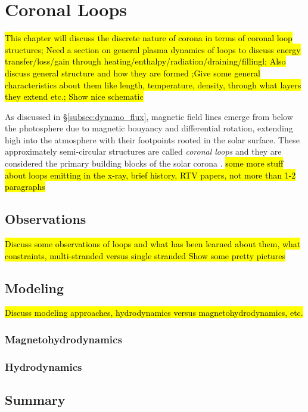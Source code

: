 \chapter{Coronal Loops}
\label{ch:coronal_loops}
\hl{This chapter will discuss the discrete nature of corona in terms of coronal loop structures; Need a section on general plasma dynamics of loops to discuss energy transfer/loss/gain through heating/enthalpy/radiation/draining/fillingl; Also discuss general structure and how they are formed ;Give some general characteristics about them like length, temperature, density, through what layers they extend etc.; Show nice schematic}
\par As discussed in \S\ref{subsec:dynamo_flux}, magnetic field lines emerge from below the photosphere due to magnetic bouyancy and differential rotation, extending high into the atmosphere with their footpoints rooted in the solar surface. These approximately semi-circular structures are called \textit{coronal loops} and they are considered the primary building blocks of the solar corona \citep{reale_coronal_2010}. \hl{some more stuff about loops emitting in the x-ray, brief history, RTV papers, not more than 1-2 paragraphs}
\section{Observations}
\label{sec:observations}
\hl{Discuss some observations of loops and what has been learned about them, what constraints, multi-stranded versus single stranded
Show some pretty pictures}
\section{Modeling}
\label{sec:modeling}
\hl{Discuss modeling approaches, hydrodynamics versus magnetohydrodynamics, etc.}
\subsection{Magnetohydrodynamics}
\subsection{Hydrodynamics}
\section{Summary}
